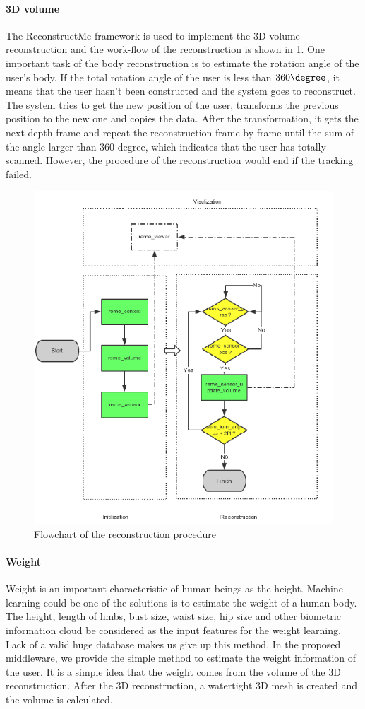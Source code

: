 \paragraph{3D volume}
The ReconstructMe framework is used to implement the 3D volume reconstruction and the work-flow of the reconstruction is shown in \figurename{\ref{fig:3-PRMM:bodyReconstruction}}. One important task of the body reconstruction is to estimate the rotation angle of the user's body. If the total rotation angle of the user is less than $360\degree$, it means that the user hasn't been constructed and the system goes to reconstruct. The system tries to get the new position of the user, transforms the previous position to the new one and copies the data. After the transformation, it gets the next depth frame and repeat the reconstruction frame by frame until the sum of the angle larger than 360 degree, which indicates that the user has totally scanned. However, the procedure of the reconstruction would end if the tracking failed.
\begin{figure}
\centering
\includegraphics[width=0.7\linewidth]{figures/3-PRMM/bodyReconstruction}
\caption{Flowchart of the reconstruction procedure}
\label{fig:3-PRMM:bodyReconstruction}
\end{figure}

\paragraph{Weight}
Weight is an important characteristic of human beings as the height. Machine learning could be one of the solutions is to estimate the weight of a human body. The height, length of limbs, bust size, waist size, hip size and other biometric information cloud be considered as the input features for the weight learning. Lack of a valid huge database makes us give up this method. 
In the proposed middleware, we provide the simple method to estimate the weight information of the user. It is a simple idea that the weight comes from the volume of the 3D reconstruction. After the 3D reconstruction, a watertight 3D mesh is created and the volume is calculated.

